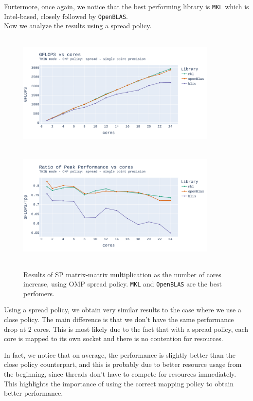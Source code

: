 \documentclass{report}
\begin{document}
Furtermore, once again, we notice that the best performing library is 
\texttt{MKL} which is Intel-based, closely followed by \texttt{OpenBLAS}.
\\

Now we analyze the results using a spread policy.

\begin{figure}[H]
\hspace*{-2.5cm}
\includegraphics[width=10cm, height=6cm]{./images/fixed_size_thin_float_gflops_spread.pdf}
\includegraphics[width=10cm, height=6cm]{./images/fixed_size_thin_float_gflops_spread_ratio.pdf}
\caption{\label{fig:fixed_size_thin_float_spread} Results of SP matrix-matrix multiplication 
    as the number of cores increase, using OMP spread policy. \texttt{MKL} 
and \texttt{OpenBLAS} are the best perfomers.}
\end{figure}

Using a spread policy, we obtain very similar results to the case where we use 
a close policy. The main difference is that we don't have the same performance 
drop at 2 cores. This is most likely due to the fact that with a spread policy, 
each core is mapped to its own socket and there is no contention for resources. 

In fact, we notice that on average, the performance is slightly better than the 
close policy counterpart, and this is probably due to better resource usage 
from the beginning, since threads don't have to compete for resources immediately.
This highlights the importance of using the correct mapping policy to obtain 
better performance.
\\
\end{document}
